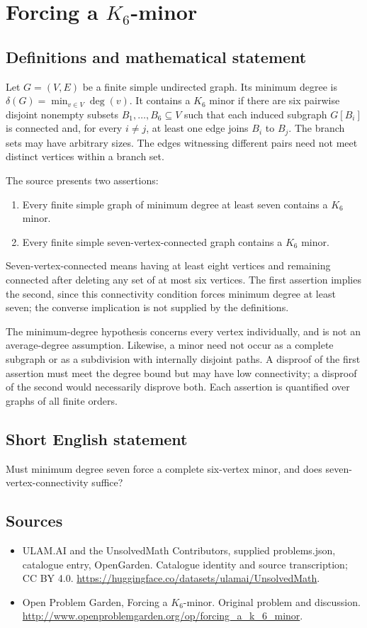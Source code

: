 \documentclass[11pt,a4paper]{article}
\begin{document}
\section*{Forcing a $K_6$-minor}\label{statement}

\subsection{Definitions and mathematical statement}
Let $G=(V,E)$ be a finite simple undirected graph. Its minimum degree is $\delta(G)=\min_{v\in V}\deg(v)$. It contains a $K_6$ minor if there are six pairwise disjoint nonempty subsets $B_1,\ldots,B_6\subseteq V$ such that each induced subgraph $G[B_i]$ is connected and, for every $i\ne j$, at least one edge joins $B_i$ to $B_j$. The branch sets may have arbitrary sizes. The edges witnessing different pairs need not meet distinct vertices within a branch set.

The source presents two assertions:
\begin{enumerate}
\item Every finite simple graph of minimum degree at least seven contains a $K_6$ minor.
\item Every finite simple seven-vertex-connected graph contains a $K_6$ minor.
\end{enumerate}
Seven-vertex-connected means having at least eight vertices and remaining connected after deleting any set of at most six vertices. The first assertion implies the second, since this connectivity condition forces minimum degree at least seven; the converse implication is not supplied by the definitions.

The minimum-degree hypothesis concerns every vertex individually, and is not an average-degree assumption. Likewise, a minor need not occur as a complete subgraph or as a subdivision with internally disjoint paths. A disproof of the first assertion must meet the degree bound but may have low connectivity; a disproof of the second would necessarily disprove both. Each assertion is quantified over graphs of all finite orders.
\subsection{Short English statement}
Must minimum degree seven force a complete six-vertex minor, and does seven-vertex-connectivity suffice?
\subsection{Sources}
\begin{itemize}
\item[S1] ULAM.AI and the UnsolvedMath Contributors, supplied problems.json, catalogue entry, OpenGarden. Catalogue identity and source transcription; CC BY 4.0.
\url{https://huggingface.co/datasets/ulamai/UnsolvedMath}.
\item[S2] Open Problem Garden, Forcing a $K_6$-minor. Original problem and discussion.
\url{http://www.openproblemgarden.org/op/forcing_a_k_6_minor}.
\end{itemize}
\end{document}
